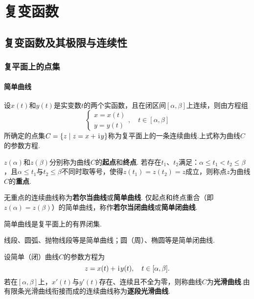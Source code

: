 \chapter{复变函数}
\section{复变函数及其极限与连续性}
\subsection{复平面上的点集}
\subsubsection{简单曲线}
\begin{definition}
设\(x(t)\)和\(y(t)\)是实变数\(t\)的两个实函数，且在闭区间\([\alpha,\beta]\)上连续，则由方程组\[
\left\{ \begin{array}{l}
x = x(t) \\
y = y(t)
\end{array} \right., \quad t \in [\alpha,\beta]
\]所确定的点集\(C = \{ z \mid z = x + \kern1pt\mathrm{i}\kern1pt y \}\)称为复平面上的一条连续曲线.上式称为曲线\(C\)的参数方程.

\(z(\alpha)\)和\(z(\beta)\)分别称为曲线\(C\)的\textbf{起点}和\textbf{终点}.
若存在\(t_1\)、\(t_2\)满足：\(\alpha \leqslant t_1 < t_2 \leqslant \beta\)，且\(\alpha \leqslant t_1\)与\(t_2 \leqslant \beta\)不同时取等号，使得\(z(t_1) = z(t_2) = z\)成立，则称点\(z\)为曲线\(C\)的\textbf{重点}.

无重点的连续曲线称为\textbf{若尔当曲线}或\textbf{简单曲线}.
仅起点和终点重合（即\(z(\alpha)=z(\beta)\)）的简单曲线，称作\textbf{若尔当闭曲线}或\textbf{简单闭曲线}.
\end{definition}

\begin{property}
简单曲线是复平面上的有界闭集.
\end{property}

\begin{example}
线段、圆弧、抛物线段等是简单曲线；圆（周）、椭圆等是简单闭曲线.
\end{example}

\begin{definition}
设简单（闭）曲线\(C\)的参数方程为\[
z = x(t) + \kern1pt\mathrm{i}\kern1pt y(t), \quad t \in [\alpha,\beta].
\]若在\([\alpha,\beta]\)上，\(x'(t)\)与\(y'(t)\)存在、连续且不全为零，则称曲线\(C\)为\textbf{光滑曲线}.由有限条光滑曲线衔接而成的连续曲线称为\textbf{逐段光滑曲线}.
\end{definition}

